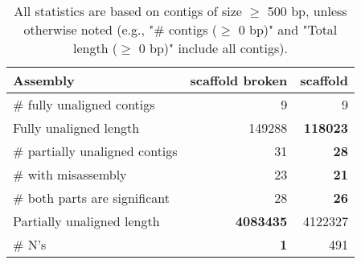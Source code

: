 \documentclass[12pt,a4paper]{article}
\begin{document}
\begin{table}[ht]
\begin{center}
\caption{All statistics are based on contigs of size $\geq$ 500 bp, unless otherwise noted (e.g., "\# contigs ($\geq$ 0 bp)" and "Total length ($\geq$ 0 bp)" include all contigs).}
\begin{tabular}{|l*{2}{|r}|}
\hline
Assembly & scaffold broken & scaffold \\ \hline
\# fully unaligned contigs & 9 & 9 \\ \hline
Fully unaligned length & 149288 & {\bf 118023} \\ \hline
\# partially unaligned contigs & 31 & {\bf 28} \\ \hline
\hspace{5mm}\# with misassembly & 23 & {\bf 21} \\ \hline
\hspace{5mm}\# both parts are significant & 28 & {\bf 26} \\ \hline
Partially unaligned length & {\bf 4083435} & 4122327 \\ \hline
\# N's & {\bf 1} & 491 \\ \hline
\end{tabular}
\end{center}
\end{table}
\end{document}

